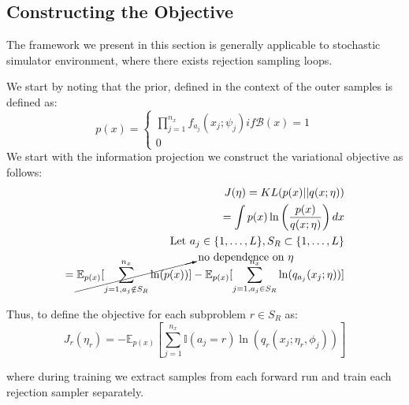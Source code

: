 \documentclass{article}
\begin{document}
\subsection{Constructing the Objective}

The framework we present in this section is generally applicable to stochastic simulator 
environment, where there exists rejection sampling loops. 

We start by noting that the prior, defined in the context of the outer samples is 
defined as: 
\begin{equation}
  p(x) = 
  \begin{cases}
    \prod^{n_{x}}_{j=1} f_{a_j}(x_j ; \psi_j) if \mathcal{B}(x) = 1 \\
    0
  \end{cases}
\end{equation}
We start with the information projection we construct the variational objective as follows:
\begin{align*}
  J(\eta) = KL(p(x) || q(x; \eta)) \\
   = \int p(x)\ln\left(\frac{p(x)}{q(x;\eta)}\right) dx \\
   \text{Let } a_{j} \in \{1, \ldots, L\} , S_{R} \subset \{1, \ldots, L\} \\
   = \cancelto{\text{no dependence on } \eta}{\mathbb{E}_{p(x)}[\sum^{n_x}_{j=1,a_j \notin S_{R}}\ln(p(x))]}-\mathbb{E}_{p(x)}[\sum^{n_x}_{j=1,a_j \in S_{R}}\ln(q_{a_j}(x_j;\eta))]\\
\end{align*}

Thus, to define the objective for each subproblem $r  \in S_{R}$ as:
\begin{equation}
  J_{r}(\eta_r) = -\mathbb{E}_{p(x)}[\sum^{n_x}_{j=1}\mathbb{I}(a_j = r)\ln(q_r(x_j;\eta_r, \phi_j))]
\end{equation}

where during training we extract samples from each forward run and train each rejection sampler
separately. 
\end{document}
